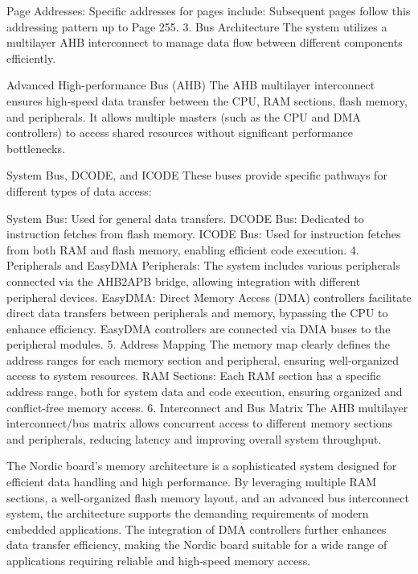 \documentclass{Configuration_Files/PoliMi3i_thesis}
\begin{document}
Page Addresses: Specific addresses for pages include:
Subsequent pages follow this addressing pattern up to Page 255.
3. Bus Architecture
The system utilizes a multilayer AHB interconnect to manage data flow between different components efficiently.

Advanced High-performance Bus (AHB)
The AHB multilayer interconnect ensures high-speed data transfer between the CPU, RAM sections, flash memory, and peripherals. It allows multiple masters (such as the CPU and DMA controllers) to access shared resources without significant performance bottlenecks.

System Bus, DCODE, and ICODE
These buses provide specific pathways for different types of data access:

System Bus: Used for general data transfers.
DCODE Bus: Dedicated to instruction fetches from flash memory.
ICODE Bus: Used for instruction fetches from both RAM and flash memory, enabling efficient code execution.
4. Peripherals and EasyDMA
Peripherals: The system includes various peripherals connected via the AHB2APB bridge, allowing integration with different peripheral devices.
EasyDMA: Direct Memory Access (DMA) controllers facilitate direct data transfers between peripherals and memory, bypassing the CPU to enhance efficiency. EasyDMA controllers are connected via DMA buses to the peripheral modules.
5. Address Mapping
The memory map clearly defines the address ranges for each memory section and peripheral, ensuring well-organized access to system resources.
RAM Sections: Each RAM section has a specific address range, both for system data and code execution, ensuring organized and conflict-free memory access.
6. Interconnect and Bus Matrix
The AHB multilayer interconnect/bus matrix allows concurrent access to different memory sections and peripherals, reducing latency and improving overall system throughput.

The Nordic board's memory architecture is a sophisticated system designed for efficient data handling and high performance. By leveraging multiple RAM sections, a well-organized flash memory layout, and an advanced bus interconnect system, the architecture supports the demanding requirements of modern embedded applications. The integration of DMA controllers further enhances data transfer efficiency, making the Nordic board suitable for a wide range of applications requiring reliable and high-speed memory access.
\end{document}
